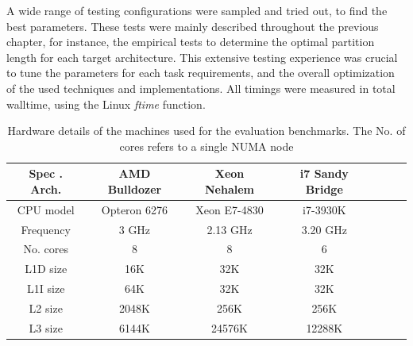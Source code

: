 A wide range of testing configurations were sampled and tried out, to find the best parameters. These tests were mainly described throughout the previous chapter, for instance, the empirical tests to determine the optimal partition length for each target architecture. This extensive testing experience was crucial to tune the parameters for each task requirements, and the overall optimization of the used techniques and implementations. All timings were measured in total walltime, using the Linux \emph{ftime} function.

\begin{table}[H]
\centering
\caption[Hardware details of test machines] {Hardware details of the machines used for the evaluation benchmarks. The No. of cores refers to a single NUMA node}
\label{table-archs}

\begin{tabular}{|c|c|c|c|c|c|c|}
\hline
Spec . Arch.& AMD Bulldozer	& Xeon Nehalem	& i7 Sandy Bridge	\\ \hline
CPU model	& Opteron 6276	& Xeon E7-4830	& i7-3930K 		\\ \hline
Frequency	& 3 GHz			& 2.13 GHz		& 3.20 GHz		\\ \hline
No. cores 	& 8				& 8				& 6				\\ \hline
L1D size	& 16K			& 32K			& 32K			\\ \hline
L1I size	& 64K			& 32K			& 32K			\\ \hline
L2 size		& 2048K			& 256K			& 256K			\\ \hline
L3 size		& 6144K			& 24576K		& 12288K		\\ \hline
\end{tabular}
\end{table}



